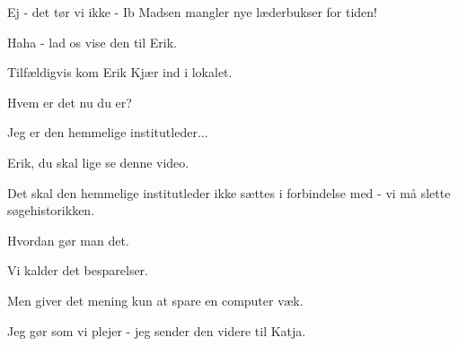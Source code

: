 \documentclass[a4paper,11pt]{article}
\begin{document}
\begin{sketch}
 Ej - det tør vi ikke - Ib Madsen mangler nye læderbukser for tiden!

 Haha - lad os vise den til Erik.

 Tilfældigvis kom Erik Kjær ind i lokalet.


 Hvem er det nu du er?

 Jeg er den hemmelige institutleder...

 Erik, du skal lige se denne video.

 Det skal den hemmelige institutleder ikke sættes i forbindelse med - vi må slette søgehistorikken.

 Hvordan gør man det.



 Vi kalder det besparelser.

 Men giver det mening kun at spare en computer væk.

 Jeg gør som vi plejer - jeg sender den videre til Katja.
\end{sketch}
\end{document}

